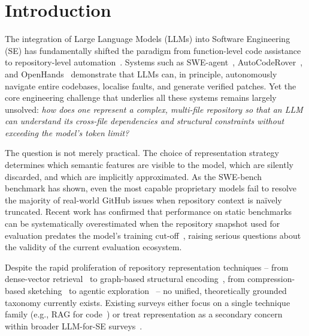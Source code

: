 \documentclass[acmsmall,screen,review]{acmart}
\begin{document}


\maketitle

\section{Introduction}

The integration of Large Language Models (LLMs) into Software
Engineering (SE) has fundamentally shifted the paradigm from
function-level code assistance to repository-level
automation~\cite{Hou2024, Jiang2026, Zhang2026Survey}. Systems such as
SWE-agent~\cite{Yang2024SWEAgent}, AutoCodeRover~\cite{Zhang2024ACR},
and OpenHands~\cite{Wang2025OpenHands} demonstrate that LLMs can, in
principle, autonomously navigate entire codebases, localise faults, and
generate verified patches. Yet the core engineering challenge that
underlies all these systems remains largely unsolved: \emph{how does one
represent a complex, multi-file repository so that an LLM can understand
its cross-file dependencies and structural constraints without exceeding
the model's token limit?}

The question is not merely practical. The choice of representation
strategy determines which semantic features are visible to the model,
which are silently discarded, and which are implicitly approximated. As
the SWE-bench~\cite{Jimenez2024} benchmark has shown, even the most
capable proprietary models fail to resolve the majority of real-world
GitHub issues when repository context is naïvely truncated. Recent work
has confirmed that performance on static benchmarks can be
systematically overestimated when the repository snapshot used for
evaluation predates the model's training
cut-off~\cite{Zheng2025HumanEvo}, raising serious questions about the
validity of the current evaluation ecosystem.

Despite the rapid proliferation of repository representation techniques
-- from dense-vector retrieval~\cite{Feng2020CodeBERT, Guo2022UniX} to
graph-based structural
encoding~\cite{Guo2021GraphCodeBERT, Liu2025CodexGraph}, from
compression-based
sketching~\cite{Zan2025CodeS, Shi2025LongCodeZip} to agentic
exploration~\cite{Yang2024SWEAgent, Zhang2024ACR} -- no unified,
theoretically grounded taxonomy currently exists. Existing surveys
either focus on a single technique family (e.g., RAG for
code~\cite{Tao2026RAGSurvey}) or treat representation as a secondary
concern within broader LLM-for-SE surveys~\cite{Hou2024, Husein2025}.
\end{document}
